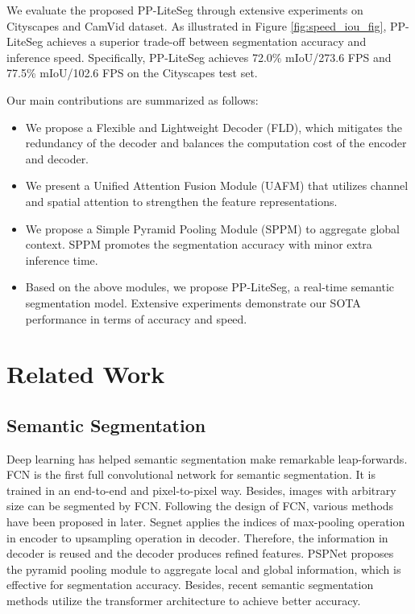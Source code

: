 \documentclass[10pt,twocolumn,letterpaper]{article}
\begin{document}
We evaluate the proposed PP-LiteSeg through extensive experiments on Cityscapes and CamVid dataset. As illustrated in Figure \ref{fig:speed_iou_fig}, PP-LiteSeg achieves a superior trade-off between segmentation accuracy and inference speed. Specifically, PP-LiteSeg achieves 72.0\% mIoU/273.6 FPS and 77.5\% mIoU/102.6 FPS on the Cityscapes test set.

Our main contributions are summarized as follows:
\begin{itemize}
\item We propose a Flexible and Lightweight Decoder (FLD), which mitigates the redundancy of the decoder and balances the computation cost of the encoder and decoder.
\item We present a Unified Attention Fusion Module (UAFM) that utilizes channel and spatial attention to strengthen the feature representations.
\item We propose a Simple Pyramid Pooling Module (SPPM) to aggregate global context. SPPM promotes the segmentation accuracy with minor extra inference time.
\item Based on the above modules, we propose PP-LiteSeg, a real-time semantic segmentation model. Extensive experiments demonstrate our SOTA performance in terms of accuracy and speed.
\end{itemize}



\section{Related Work}
\label{sec:related_work}

\subsection{Semantic Segmentation}
Deep learning has helped semantic segmentation make remarkable leap-forwards.
FCN \cite{long2015fully} is the first full convolutional network for semantic segmentation. It is trained in an end-to-end and pixel-to-pixel way. Besides, images with arbitrary size can be segmented by FCN.
Following the design of FCN, various methods have been proposed in later. 
Segnet\cite{badrinarayanan2017segnet} applies the indices of max-pooling operation in encoder to upsampling operation in decoder. Therefore, the information in decoder is reused and the decoder produces refined features.
PSPNet\cite{zhao2017pyramid} proposes the pyramid pooling module to aggregate local and global information, which is effective for segmentation accuracy.
Besides, recent semantic segmentation methods \cite{huang2021fapn, liu2021swin} utilize the transformer architecture to achieve better accuracy.
\end{document}
